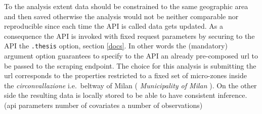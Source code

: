 \documentclass[
  12pt,
  a4paper,
  oneside]{book}
\newcommand{\passthrough}[1]{#1}
\theoremstyle{definition}
\theoremstyle{definition}
\theoremstyle{definition}
\theoremstyle{remark}
\begin{document}
To the analysis extent data should be constrained to the same geographic area and then saved otherwise the analysis would not be neither comparable nor reproducible since each time the API is called data gets updated. As a consequence the API is invoked with fixed request parameters by securing to the API the \passthrough{\lstinline!.thesis!} option, section \ref{docs}. In other words the (mandatory) argument option guarantees to specify to the API an already pre-composed url to be passed to the scraping endpoint. The choice for this analysis is submitting the url corresponds to the properties restricted to a fixed set of micro-zones inside the \emph{circonvallazione} i.e.~beltway of Milan ( \emph{Municipality of Milan} ). On the other side the resulting data is locally stored to be able to have consistent inference. (api parameters number of covariates a number of observations)
\end{document}
